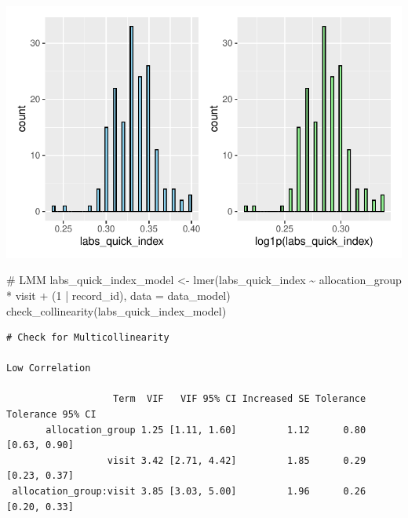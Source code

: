 \documentclass[
  12pt,
]{article}
\newenvironment{Shaded}{\begin{snugshade}}{\end{snugshade}}
\newcommand{\AttributeTok}[1]{\textcolor[rgb]{0.40,0.45,0.13}{#1}}
\newcommand{\CommentTok}[1]{\textcolor[rgb]{0.37,0.37,0.37}{#1}}
\newcommand{\DecValTok}[1]{\textcolor[rgb]{0.68,0.00,0.00}{#1}}
\newcommand{\FunctionTok}[1]{\textcolor[rgb]{0.28,0.35,0.67}{#1}}
\newcommand{\NormalTok}[1]{\textcolor[rgb]{0.00,0.23,0.31}{#1}}
\newcommand{\OtherTok}[1]{\textcolor[rgb]{0.00,0.23,0.31}{#1}}
\newcommand{\SpecialCharTok}[1]{\textcolor[rgb]{0.37,0.37,0.37}{#1}}
\begin{document}
\includegraphics{Outcomes_files/figure-pdf/labs_quick_index_1-1.pdf}

\begin{Shaded}
\begin{Highlighting}[]
\CommentTok{\# LMM}
\NormalTok{labs\_quick\_index\_model }\OtherTok{\textless{}{-}} \FunctionTok{lmer}\NormalTok{(labs\_quick\_index }\SpecialCharTok{\textasciitilde{}}\NormalTok{ allocation\_group }\SpecialCharTok{*}\NormalTok{ visit }\SpecialCharTok{+} 
\NormalTok{(}\DecValTok{1} \SpecialCharTok{|}\NormalTok{ record\_id), }\AttributeTok{data =}\NormalTok{ data\_model)}
\FunctionTok{check\_collinearity}\NormalTok{(labs\_quick\_index\_model)}
\end{Highlighting}
\end{Shaded}

\begin{verbatim}
# Check for Multicollinearity

Low Correlation

                   Term  VIF   VIF 95% CI Increased SE Tolerance Tolerance 95% CI
       allocation_group 1.25 [1.11, 1.60]         1.12      0.80     [0.63, 0.90]
                  visit 3.42 [2.71, 4.42]         1.85      0.29     [0.23, 0.37]
 allocation_group:visit 3.85 [3.03, 5.00]         1.96      0.26     [0.20, 0.33]
\end{verbatim}
\end{document}
